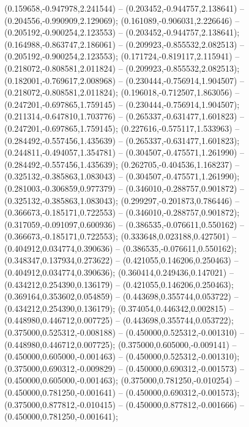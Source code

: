  (0.159658,-0.947978,2.241544) -- (0.203452,-0.944757,2.138641) -- (0.204556,-0.990909,2.129069);
 (0.161089,-0.906031,2.226646) -- (0.205192,-0.900254,2.123553) -- (0.203452,-0.944757,2.138641);
 (0.164988,-0.863747,2.186061) -- (0.209923,-0.855532,2.082513) -- (0.205192,-0.900254,2.123553);
 (0.171724,-0.819117,2.115941) -- (0.218072,-0.808581,2.011824) -- (0.209923,-0.855532,2.082513);
 (0.182001,-0.769617,2.008968) -- (0.230444,-0.756914,1.904507) -- (0.218072,-0.808581,2.011824);
 (0.196018,-0.712507,1.863056) -- (0.247201,-0.697865,1.759145) -- (0.230444,-0.756914,1.904507);
 (0.211314,-0.647810,1.703776) -- (0.265337,-0.631477,1.601823) -- (0.247201,-0.697865,1.759145);
 (0.227616,-0.575117,1.533963) -- (0.284492,-0.557456,1.435639) -- (0.265337,-0.631477,1.601823);
 (0.244811,-0.494057,1.354781) -- (0.304507,-0.475571,1.261990) -- (0.284492,-0.557456,1.435639);
 (0.262705,-0.404536,1.168237) -- (0.325132,-0.385863,1.083043) -- (0.304507,-0.475571,1.261990);
 (0.281003,-0.306859,0.977379) -- (0.346010,-0.288757,0.901872) -- (0.325132,-0.385863,1.083043);
 (0.299297,-0.201873,0.786446) -- (0.366673,-0.185171,0.722553) -- (0.346010,-0.288757,0.901872);
 (0.317059,-0.091097,0.600936) -- (0.386535,-0.076611,0.550162) -- (0.366673,-0.185171,0.722553);
 (0.333648,0.023188,0.427501) -- (0.404912,0.034774,0.390636) -- (0.386535,-0.076611,0.550162);
 (0.348347,0.137934,0.273622) -- (0.421055,0.146206,0.250463) -- (0.404912,0.034774,0.390636);
 (0.360414,0.249436,0.147021) -- (0.434212,0.254390,0.136179) -- (0.421055,0.146206,0.250463);
 (0.369164,0.353602,0.054859) -- (0.443698,0.355744,0.053722) -- (0.434212,0.254390,0.136179);
 (0.374054,0.446342,0.002815) -- (0.448980,0.446712,0.007725) -- (0.443698,0.355744,0.053722);
 (0.375000,0.525312,-0.008188) -- (0.450000,0.525312,-0.001310) -- (0.448980,0.446712,0.007725);
 (0.375000,0.605000,-0.009141) -- (0.450000,0.605000,-0.001463) -- (0.450000,0.525312,-0.001310);
 (0.375000,0.690312,-0.009829) -- (0.450000,0.690312,-0.001573) -- (0.450000,0.605000,-0.001463);
 (0.375000,0.781250,-0.010254) -- (0.450000,0.781250,-0.001641) -- (0.450000,0.690312,-0.001573);
 (0.375000,0.877812,-0.010415) -- (0.450000,0.877812,-0.001666) -- (0.450000,0.781250,-0.001641);
